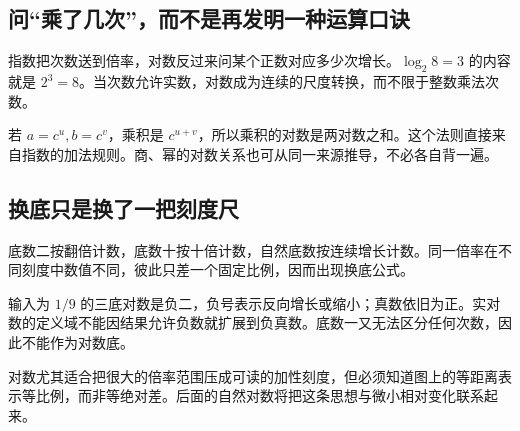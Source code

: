 \subsection*{问“乘了几次”，而不是再发明一种运算口诀}
指数把次数送到倍率，对数反过来问某个正数对应多少次增长。$\log_2 8=3$ 的内容就是 $2^3=8$。当次数允许实数，对数成为连续的尺度转换，而不限于整数乘法次数。

若 $a=c^u,b=c^v$，乘积是 $c^{u+v}$，所以乘积的对数是两对数之和。这个法则直接来自指数的加法规则。商、幂的对数关系也可从同一来源推导，不必各自背一遍。

\subsection*{换底只是换了一把刻度尺}
底数二按翻倍计数，底数十按十倍计数，自然底数按连续增长计数。同一倍率在不同刻度中数值不同，彼此只差一个固定比例，因而出现换底公式。

输入为 $1/9$ 的三底对数是负二，负号表示反向增长或缩小；真数依旧为正。实对数的定义域不能因结果允许负数就扩展到负真数。底数一又无法区分任何次数，因此不能作为对数底。

对数尤其适合把很大的倍率范围压成可读的加性刻度，但必须知道图上的等距离表示等比例，而非等绝对差。后面的自然对数将把这条思想与微小相对变化联系起来。
